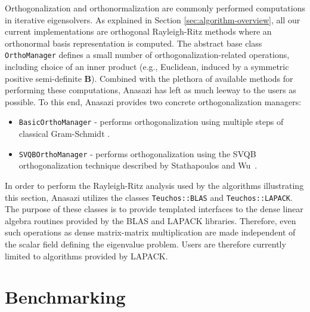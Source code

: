 \documentclass[acmtoms]{acmtrans2m}
\newcounter{algorithm}
\newcommand{\aspace}[1]{\texttt{#1}}
\begin{document}
Orthogonalization and orthonormalization are commonly performed
computations in iterative eigensolvers. As explained in Section
\ref{sec:algorithm-overview}, all our current implementations are
orthogonal Rayleigh-Ritz methods where an orthonormal basis
representation is computed. The abstract base class
\aspace{OrthoManager} defines a small number of
orthogonalization-related operations, including choice of an inner
product (e.g., Euclidean, induced by a symmetric positive semi-definite
$\mathbf{B}$). Combined with the plethora of available methods for
performing these computations, Anasazi has left as much leeway to
the users as possible. To this end, Anasazi provides two concrete
orthogonalization managers:
\begin{itemize}
\item
  \aspace{BasicOrthoManager} - performs orthogonalization using
  multiple steps of classical Gram-Schmidt \cite{dgks:76}.
\item
  \aspace{SVQBOrthoManager} - performs orthogonalization using the
  SVQB orthogonalization technique described by Stathapoulos and
  Wu~\cite{Stathopoulos:2002:BOP}.
\end{itemize}

In order to perform the Rayleigh-Ritz analysis used by the
algorithms illustrating this section, Anasazi utilizes the classes
\aspace{Teuchos::BLAS} and \aspace{Teuchos::LAPACK}. The purpose of
these classes is to provide templated interfaces to the dense linear
algebra routines provided by the BLAS and LAPACK libraries.
Therefore, even such operations as dense matrix-matrix
multiplication are made independent of the scalar field defining the
eigenvalue problem. Users are therefore currently limited to
algorithms provided by LAPACK.

\section{Benchmarking}
\label{sec:benchmarking}
\end{document}
